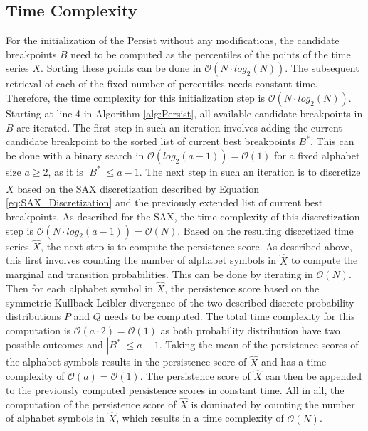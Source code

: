 \subsection*{Time Complexity}
For the initialization of the Persist without any modifications, the candidate breakpoints $B$ need to be computed as the percentiles of the points of the time series $X$. Sorting these points can be done in $\mathcal{O}(N \cdot log_{2}(N))$. The subsequent retrieval of each of the fixed number of percentiles needs constant time. Therefore, the time complexity for this initialization step is $\mathcal{O}(N \cdot log_{2}(N))$. \newline
Starting at line 4 in Algorithm \ref{alg:Persist}, all available candidate breakpoints in $B$ are iterated.
The first step in such an iteration involves adding the current candidate breakpoint to the sorted list of current best breakpoints $B^*$. This can be done with a binary search in $\mathcal{O}(log_{2}(a-1)) = \mathcal{O}(1)$ for a fixed alphabet size $a \geq 2$, as it is $|B^*| \leq a-1$. \newline
The next step in such an iteration is to discretize $X$ based on the \ac{SAX} discretization described by Equation \ref{eq:SAX_Discretization} and the previously extended list of current best breakpoints. As described for the \ac{SAX}, the time complexity of this discretization step is $\mathcal{O}(N \cdot log_{2}(a-1)) = \mathcal{O}(N)$. \newline
Based on the resulting discretized time series $\hat{X}$, the next step is to compute the persistence score. As described above, this first involves counting the number of alphabet symbols in $\hat{X}$ to compute the marginal and transition probabilities. This can be done by iterating in $\mathcal{O}(N)$. Then for each alphabet symbol in $\hat{X}$, the persistence score based on the symmetric Kullback-Leibler divergence of the two described discrete probability distributions $P$ and $Q$ needs to be computed. The total time complexity for this computation is $\mathcal{O}(a \cdot 2) = \mathcal{O}(1)$ as both probability distribution have two possible outcomes and $|B^*| \leq a-1$. Taking the mean of the persistence scores of the alphabet symbols results in the persistence score of $\hat{X}$ and has a time complexity of $\mathcal{O}(a) = \mathcal{O}(1)$. The persistence score of $\hat{X}$ can then be appended to the previously computed persistence scores in constant time. All in all, the computation of the persistence score of $\hat{X}$ is dominated by counting the number of alphabet symbols in $\hat{X}$, which results in a time complexity of $\mathcal{O}(N)$. \newline
